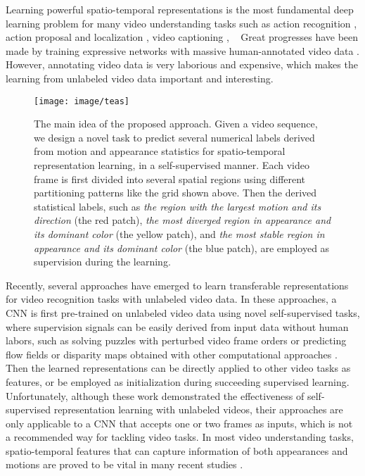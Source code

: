 \documentclass[10pt,twocolumn,letterpaper]{article}
\begin{document}
Learning powerful spatio-temporal representations is the most fundamental deep learning problem for many video understanding tasks such as action recognition \cite{carreira2017quo, jiang2015human, liu2016video}, action proposal and localization \cite{chao2018rethinking, shou2017cdc, shou2016temporal}, video captioning \cite{wang2018reconstruction, wang2018bidirectional}, \etc ~
Great progresses have been made by training expressive networks with massive human-annotated video data \cite{tran2015learning,r2plus1d_cvpr18}. 
However, annotating video data is very laborious and expensive, which makes the learning from unlabeled video data important and interesting.

\begin{figure}[t]
    \centering
    \texttt{[image: image/teas]}
    \caption{The main idea of the proposed approach. Given a video sequence, we design a novel task to predict several numerical labels derived from motion and appearance statistics for  spatio-temporal representation learning, in a self-supervised manner. Each video frame is first divided into several spatial regions using different partitioning patterns like the grid shown above. Then the derived statistical labels, such as \emph{the region with the largest motion and its direction} (the red patch), \emph{the most diverged region in appearance and its dominant color} (the yellow patch), and \emph{the most stable region in appearance and its dominant color} (the blue patch), are employed as supervision during the learning.}
    \label{fig:teas}\vspace{-4mm}
\end{figure}

Recently, several approaches \cite{misra2016shuffle, fernando2017self, lee2017unsupervised, gan2018geometry} have emerged to learn transferable representations for video recognition tasks with unlabeled video data. 
In these approaches, a CNN is first pre-trained on unlabeled video data using novel self-supervised tasks, where supervision signals can be easily derived from input data without human labors, such as solving puzzles with perturbed video frame orders \cite{misra2016shuffle,fernando2017self,lee2017unsupervised} or predicting flow fields or disparity maps obtained with other computational approaches \cite{gan2018geometry}. 
Then the learned representations can be directly applied to other video tasks as features, or be employed as initialization during succeeding supervised learning. 
Unfortunately, although these work demonstrated the effectiveness of self-supervised representation learning with unlabeled videos, their approaches are only applicable to a CNN that accepts one or two frames as inputs, which is not a recommended way for tackling video tasks. 
In most video understanding tasks, spatio-temporal features that can capture information of both appearances and motions are proved to be vital in many recent studies \cite{cao2013mining,simonyan2014two,tran2015learning,carreira2017quo,r2plus1d_cvpr18}. 
\end{document}
